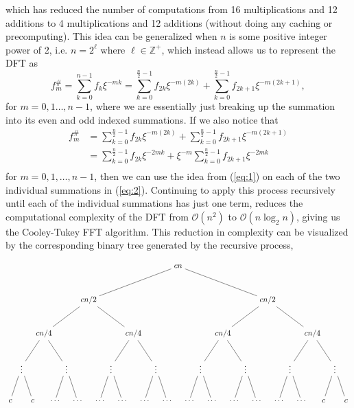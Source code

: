 \documentclass[11pt]{article}
\begin{document}
which has reduced the number of computations from 16 multiplications and 12 additions to 4 multiplications
and 12 additions (without doing any caching or precomputing).
This idea can be generalized when $n$ is some positive integer power of 2,
i.e. $n = 2^{\ell}$ where $\ell \in \mathbb{Z}^+$, which instead allows us to represent the DFT as
\begin{equation}
	\label{eq:1}
	f_{m}^{\#} = \sum_{k=0}^{n-1}{f_k\xi^{-mk}} = \sum_{k=0}^{\frac{n}{2}-1}{f_{2k}\xi^{-m(2k)}} + \sum_{k=0}^{\frac{n}{2}-1}{f_{2k + 1}\xi^{-m(2k+1)}},
\end{equation}
for $m = 0,1\dots,n-1$, where we are essentially just breaking up the summation into its even and odd indexed
summations. If we also notice that
\begin{equation}
	\begin{aligned}
		f_{m}^{\#} &= \sum_{k=0}^{\frac{n}{2}-1}{f_{2k}\xi^{-m(2k)}} + \sum_{k=0}^{\frac{n}{2}-1}{f_{2k + 1}\xi^{-m(2k+1)}} \\
		&= \sum_{k=0}^{\frac{n}{2}-1}{f_{2k}\xi^{-2mk}} + \xi^{-m}\sum_{k=0}^{\frac{n}{2}-1}{f_{2k + 1}\xi^{-2mk}} \\
	\end{aligned}
	\label{eq:2}
\end{equation}
for $m = 0,1,\dots,n-1$, then we can use the idea from (\ref{eq:1}) on each of the two individual summations in (\ref{eq:2}).
Continuing to apply this process recursively until each of the individual summations has just one term,
reduces the computational complexity of the DFT from
$\mathcal{O}(n^2)$ to $\mathcal{O}(n\log_2{n})$, giving us the Cooley-Tukey FFT algorithm.
This reduction in complexity can be visualized by the corresponding binary tree generated by the recursive process,

\[
\begin{tikzpicture}[level distance=1.5cm,
  level 1/.style={sibling distance=8cm},
  level 2/.style={sibling distance=4cm},
  level 3/.style={sibling distance=2cm},
  level 4/.style={sibling distance=1cm}]

  \node {$cn$}
    child {node {$cn/2$}
      child {node {$cn/4$}
        child {node {$\vdots$}
          child {node {$c$}}
          child {node {$c$}}
        }
        child {node {$\vdots$}
          child {node {$\ldots$}}
          child {node {$\ldots$}}
        }
      }
      child {node {$cn/4$}
        child {node {$\vdots$}
          child {node {$\ldots$}}
          child {node {$\ldots$}}
        }
        child {node {$\vdots$}
          child {node {$\ldots$}}
          child {node {$\ldots$}}
        }
      }
    }
    child {node {$cn/2$}
      child {node {$cn/4$}
        child {node {$\vdots$}
          child {node {$\ldots$}}
          child {node {$\ldots$}}
        }
        child {node {$\vdots$}
          child {node {$\ldots$}}
          child {node {$\ldots$}}
        }
      }
      child {node {$cn/4$}
        child {node {$\vdots$}
          child {node {$\ldots$}}
          child {node {$\ldots$}}
        }
        child {node {$\vdots$}
          child {node {$c$}}
          child {node {$c$}}
        }
      }
    };
\end{tikzpicture}
\]
\end{document}
